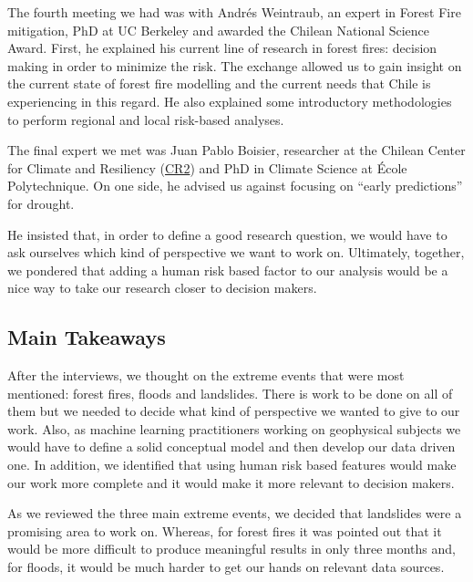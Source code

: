 \documentclass[sigconf, nonacm]{acmart}
\begin{document}
The fourth meeting we had was with Andrés Weintraub, an expert in Forest Fire mitigation, PhD at UC Berkeley and awarded the Chilean National Science Award. First, he explained his current line of research in forest fires: decision making in order to minimize the risk. The exchange allowed us to gain insight on the current state of forest fire modelling and the current needs that Chile is experiencing in this regard. He also explained some introductory methodologies to perform regional and local risk-based analyses. 


The final expert we met was Juan Pablo Boisier, researcher at the Chilean Center for Climate and Resiliency (\href{https://www.cr2.cl}{CR2}) and PhD in Climate Science at École Polytechnique. On one side, he advised us against focusing on “early predictions” for drought. 




He insisted that, in order to define a good research question, we would have to ask ourselves which kind of perspective we want to work on. Ultimately, together, we pondered that adding a human risk based factor to our analysis would be a nice way to take our research closer to decision makers. 


\subsection{Main Takeaways}

After the interviews, we thought on the extreme events that were most mentioned: forest fires, floods and landslides. There is work to be done on all of them but we needed to decide what kind of perspective we wanted to give to our work. Also, as machine learning practitioners working on geophysical subjects we would have to define a solid conceptual model and then develop our data driven one. In addition, we identified that using human risk based features would make our work more complete and it would make it more relevant to decision makers. 

As we reviewed the three main extreme events, we decided that landslides were a promising area to work on. Whereas, for forest fires it was pointed out that it would be more difficult to produce meaningful results in only three months and, for floods, it would be much harder to get our hands on relevant data sources.
\end{document}
